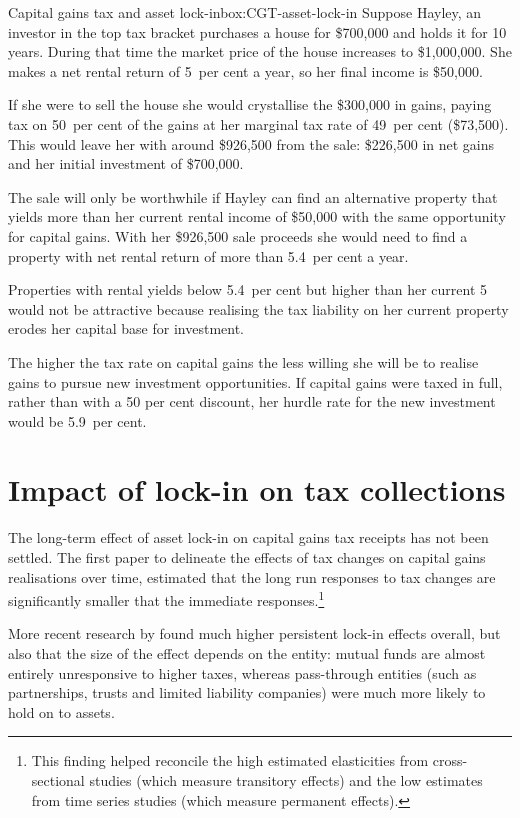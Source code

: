 \begin{subappendices}
\begin{smallbox}[!hp]{Capital gains tax and asset lock-in}{box:CGT-asset-lock-in}
Suppose Hayley, an investor in the top tax bracket purchases a house for \$700,000 and holds it for 10 years. During that time the market price of the house increases to \$1,000,000. She makes a net rental return of 5~per cent a year, so her  final income is \$50,000. 

If she were to sell the house she would crystallise the \$300,000 in gains, paying tax on 50~per cent of the gains at her marginal tax rate of 49~per cent (\$73,500). This would leave her with around \$926,500 from the sale: \$226,500 in net gains and her initial investment of \$700,000. 

The sale will only be worthwhile if Hayley can find an alternative property that yields more than her current rental income of \$50,000  with the same opportunity for capital gains. With her \$926,500 sale proceeds she would need to find a property with net rental return of more than 5.4~per cent a year. 

Properties with rental yields below 5.4~per cent but higher than her current 5 would not be attractive because realising the tax liability on her current property erodes her capital base for investment.  

The higher the tax rate on capital gains the less willing she will be to realise gains to pursue new investment opportunities. If capital gains were taxed in full, rather than with a 50 per cent discount, her hurdle rate for the new investment would be 5.9~per cent.
\end{smallbox}
\clearpage

\section{Impact of lock-in on tax collections}

The long-term effect of asset lock-in on capital gains tax receipts has not been settled. The first paper to delineate the effects of tax changes on capital gains realisations over time, estimated that the long run responses to tax changes are significantly smaller that the immediate responses.\footnote{\textcite{BurmanRandolph1994} This finding helped reconcile the high estimated elasticities from cross-sectional studies (which measure transitory effects) and the low estimates from time series studies (which measure permanent effects).} 

More recent research by \textcite{CBO2012CapitalGainsTaxElasticity} found much higher persistent lock-in effects overall, but also that the size of the effect depends on the entity: mutual funds are almost entirely unresponsive to higher taxes, whereas pass-through entities (such as partnerships, trusts and limited liability companies) were much more likely to hold on to assets.


\end{subappendices}
